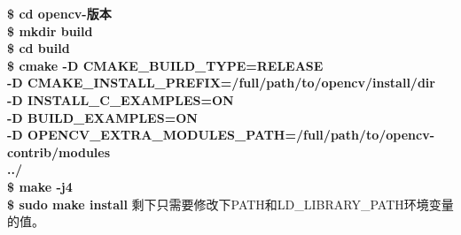  \noindent\textbf{\color{magenta}\$ cd opencv-版本} \\
 \noindent\textbf{\color{magenta}\$ mkdir build} \\
 \noindent\textbf{\color{magenta}\$ cd build} \\
 \noindent\textbf{\color{magenta}\$ cmake -D CMAKE\_BUILD\_TYPE=RELEASE\\
   -D CMAKE\_INSTALL\_PREFIX=/full/path/to/opencv/install/dir \\
   -D INSTALL\_C\_EXAMPLES=ON \\
   -D BUILD\_EXAMPLES=ON \\
   -D OPENCV\_EXTRA\_MODULES\_PATH=/full/path/to/opencv-contrib/modules\\
   ../} \\
 \noindent\textbf{\color{magenta}\$ make -j4}\\
 \noindent\textbf{\color{magenta}\$ sudo make install}
剩下只需要修改下PATH和LD\_LIBRARY\_PATH环境变量的值。

